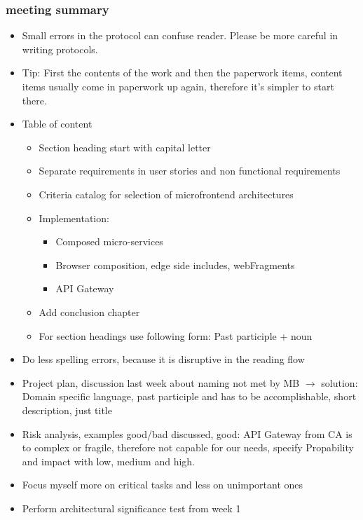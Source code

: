 \documentclass{article}
\begin{document}
\subsubsection{meeting summary}
\begin{itemize}
    \item Small errors in the protocol can confuse reader. Please be more careful in writing protocols.
    \item Tip: First the contents of the work and then the paperwork items, content items usually come in paperwork up again, therefore it's simpler to start there.
    \item Table of content
        \begin{itemize}
            \item Section heading start with capital letter
            \item Separate requirements in user stories and non functional requirements
            \item Criteria catalog for selection of microfrontend architectures
            \item Implementation:
                \begin{itemize}
                    \item Composed micro-services
                    \item Browser composition, edge side includes, webFragments
                    \item API Gateway
                \end{itemize}
            \item Add conclusion chapter
            \item For section headings use following form: Past participle + noun 
        \end{itemize}
    \item Do less spelling errors, because it is disruptive in the reading flow
    \item Project plan, discussion last week about naming not met by MB \( \rightarrow \) solution: Domain specific language, past participle and has to be accomplishable, short description, just title
    \item Risk analysis, examples good/bad discussed, good: API Gateway from CA is to complex or fragile, therefore not capable for our needs, specify Propability and impact with low, medium and high.
    \item Focus myself more on critical tasks and less on unimportant ones
    \item Perform architectural significance test from week 1

\end{itemize}
\end{document}

